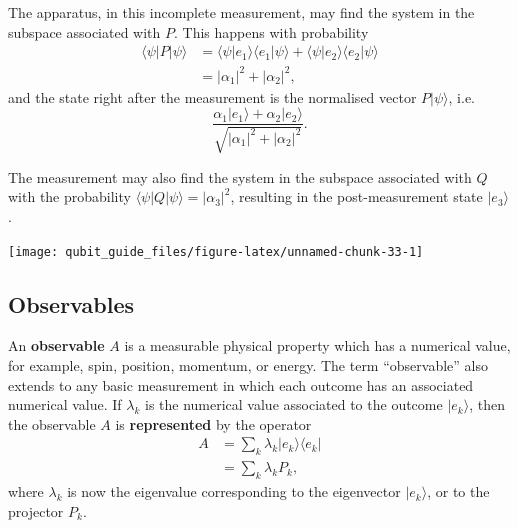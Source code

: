 \documentclass[fleqn,a4paper]{article}
\theoremstyle{definition}
\theoremstyle{definition}
\theoremstyle{definition}
\theoremstyle{definition}
\theoremstyle{remark}
\begin{document}
The apparatus, in this incomplete measurement, may find the system in the subspace associated with \(P\).
This happens with probability
\[
  \begin{aligned}
    \langle\psi|P|\psi\rangle
    &= \langle\psi|e_1\rangle \langle e_1|\psi\rangle + \langle\psi|e_2\rangle \langle e_2|\psi\rangle
  \\&= |\alpha_1|^2 + |\alpha_2|^2,
  \end{aligned}
\]
and the state right after the measurement is the normalised vector \(P|\psi\rangle\), i.e.
\[
  \frac{\alpha_1|e_1\rangle+\alpha_2|e_2\rangle}{\sqrt{|\alpha_1|^2 + |\alpha_2|^2}}.
\]

The measurement may also find the system in the subspace associated with \(Q\) with the probability \(\langle\psi|Q|\psi\rangle = |\alpha_3|^2\), resulting in the post-measurement state \(|e_3\rangle\).

\begin{center}\texttt{[image: qubit\_guide\_files/figure-latex/unnamed-chunk-33-1]} \end{center}

\hypertarget{observables}{%
\subsection{Observables}\label{observables}}

An \textbf{observable} \(A\) is a measurable physical property which has a numerical value, for example, spin, position, momentum, or energy.
The term ``observable'' also extends to any basic measurement in which each outcome has an associated numerical value.
If \(\lambda_k\) is the numerical value associated to the outcome \(|e_k\rangle\), then the observable \(A\) is \textbf{represented} by the operator
\[
  \begin{aligned}
    A
    &= \sum_k \lambda_k |e_k\rangle\langle e_k|
  \\&= \sum_k \lambda_k P_k,
  \end{aligned}
\]
where \(\lambda_k\) is now the eigenvalue corresponding to the eigenvector \(|e_k\rangle\), or to the projector \(P_k\).
\end{document}
